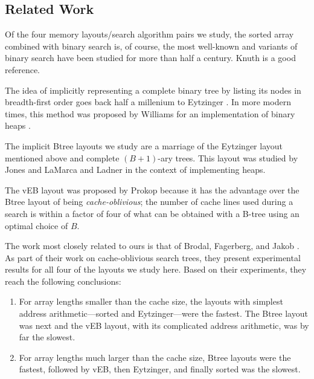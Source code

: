 \documentclass{patmorin}
\begin{document}
\subsection{Related Work}

Of the four memory layouts/search algorithm pairs we study, the sorted
array combined with binary search is, of course, the most well-known
and variants of binary search have been studied for more than half a
century. Knuth \cite[Section~6.2.1]{knuth:art} is a good reference.

The idea of implicitly representing a complete binary tree by listing
its nodes in breadth-first order goes back half a millenium to Eytzinger
\cite{eytzinger:thesaurus}. In more modern times, this method was proposed by
Williams for an implementation of binary heaps \cite{williams:algorithm}.

The implicit Btree layouts we study are a marriage of the Eytzinger layout
mentioned above and complete $(B+1)$-ary trees. This layout
was studied by Jones \cite{jones:empirical} and LaMarca and Ladner
\cite{lamarca.ladner:influence} in the context of implementing heaps.

The vEB layout was proposed by Prokop
\cite[Section~10.2]{prokop:cache-oblivious} because it has the advantage
over the Btree layout of being \emph{cache-oblivious}; the number of
cache lines used during a search is within a factor of four of what can
be obtained with a B-tree using an optimal choice of $B$.


The work most closely related to ours is that of Brodal, Fagerberg,
and Jakob \cite{brodal.fagerberg.ea:cache}. As part of their work on
cache-oblivious search trees, they present experimental results for
all four of the layouts we study here.  Based on their experiments,
they reach the following conclusions:

\begin{enumerate}

\item For array lengths smaller than the cache size, the layouts with
simplest address arithmetic---sorted and Eytzinger---were the fastest. The
Btree layout was next and the vEB layout, with its complicated address
arithmetic, was by far the slowest.

\item For array lengths much larger than the cache size, Btree layouts
were the fastest, followed by vEB, then Eytzinger, and finally sorted
was the slowest.
\end{enumerate}
\end{document}
